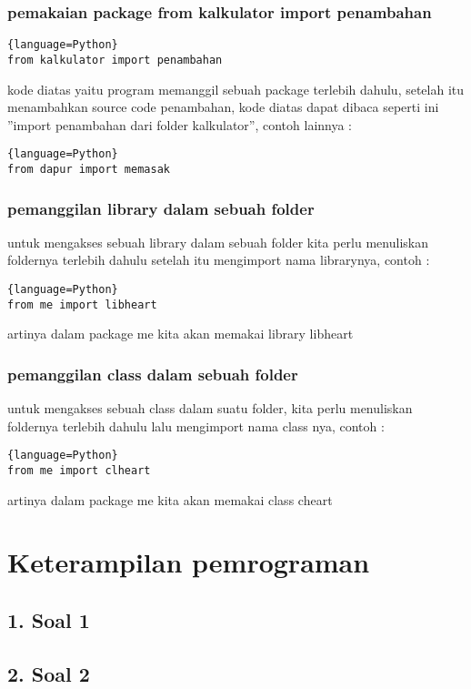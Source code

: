 \subsection{pemakaian package from kalkulator import penambahan}
\par 
\begin{lstlisting}{language=Python}
from kalkulator import penambahan
\end{lstlisting}
kode diatas yaitu program memanggil sebuah package terlebih dahulu, setelah itu menambahkan source code penambahan, kode diatas dapat dibaca seperti ini ”import penambahan dari folder kalkulator”, contoh lainnya :
\begin{lstlisting}{language=Python}
from dapur import memasak
\end{lstlisting}

\subsection{pemanggilan library dalam sebuah folder}
\par 
untuk mengakses sebuah library dalam sebuah folder kita perlu menuliskan foldernya terlebih dahulu setelah itu mengimport nama librarynya, contoh :
\begin{lstlisting}{language=Python}
from me import libheart
\end{lstlisting}
artinya dalam package me kita akan memakai library libheart

\subsection{pemanggilan class dalam sebuah folder}
\par 
untuk mengakses sebuah class dalam suatu folder, kita perlu menuliskan foldernya terlebih dahulu lalu mengimport nama class nya, contoh :
\begin{lstlisting}{language=Python}
from me import clheart
\end{lstlisting}
artinya dalam package me kita akan memakai class cheart

\chapter{Keterampilan pemrograman}
\section*{1. Soal 1}

\section*{2. Soal 2}

